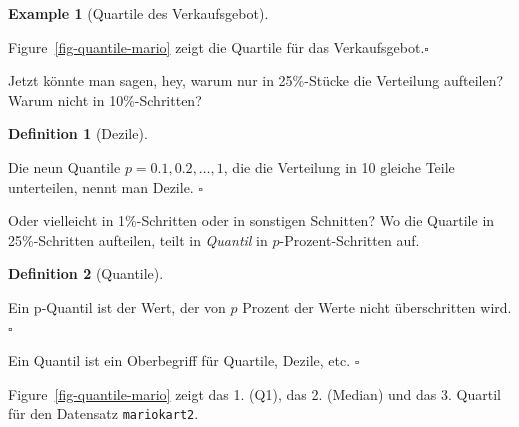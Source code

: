 \documentclass[
  letterpaper,
  DIV=11,
  numbers=noendperiod]{scrartcl}
\theoremstyle{definition}
\newtheorem{example}{Example}[section]
\theoremstyle{definition}
\theoremstyle{definition}
\newtheorem{definition}{Definition}[section]
\theoremstyle{remark}
\begin{document}
\begin{example}[Quartile des
Verkaufsgebot]\protect\hypertarget{exm-mario-qs}{}\label{exm-mario-qs}

Figure~\ref{fig-quantile-mario} zeigt die Quartile für das
Verkaufsgebot.\(\square\)

\end{example}

Jetzt könnte man sagen, hey, warum nur in 25\%-Stücke die Verteilung
aufteilen? Warum nicht in 10\%-Schritten?

\begin{definition}[Dezile]\protect\hypertarget{def-dezile}{}\label{def-dezile}

Die neun Quantile \(p= 0.1, 0.2, \ldots, 1\), die die Verteilung in 10
gleiche Teile unterteilen, nennt man Dezile. \(\square\)

\end{definition}

Oder vielleicht in 1\%-Schritten oder in sonstigen Schnitten? Wo die
Quartile in 25\%-Schritten aufteilen, teilt in \emph{Quantil} in
\(p\)-Prozent-Schritten auf.

\begin{definition}[Quantile]\protect\hypertarget{def-quantile}{}\label{def-quantile}

Ein p-Quantil ist der Wert, der von \(p\) Prozent der Werte nicht
überschritten wird.\(\square\)

\end{definition}

\begin{tcolorbox}[enhanced jigsaw, breakable, toptitle=1mm, colback=white, leftrule=.75mm, colframe=quarto-callout-note-color-frame, colbacktitle=quarto-callout-note-color!10!white, title=\textcolor{quarto-callout-note-color}{\faInfo}\hspace{0.5em}{Note}, toprule=.15mm, opacityback=0, arc=.35mm, coltitle=black, rightrule=.15mm, titlerule=0mm, bottomtitle=1mm, bottomrule=.15mm, left=2mm, opacitybacktitle=0.6]

Ein Quantil ist ein Oberbegriff für Quartile, Dezile, etc. \(\square\)

\end{tcolorbox}

Figure~\ref{fig-quantile-mario} zeigt das 1. (Q1), das 2. (Median) und
das 3. Quartil für den Datensatz \texttt{mariokart2}.
\end{document}
